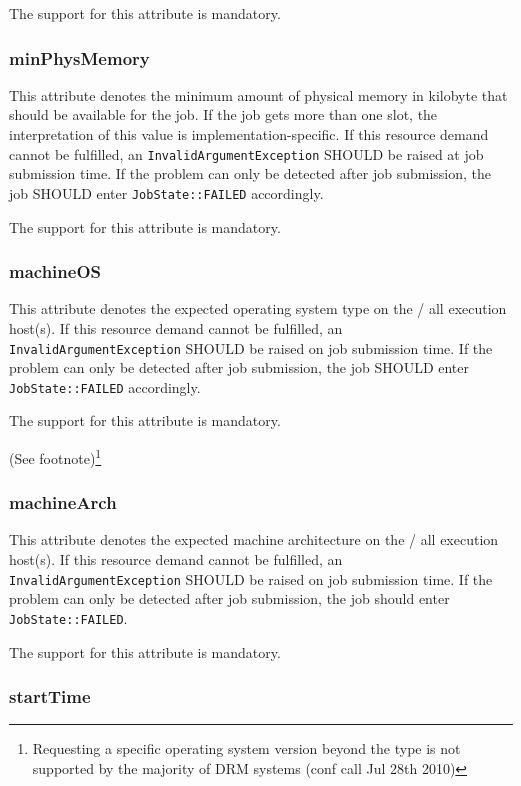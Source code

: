 \documentclass{article}
\newcommand{\h}[1]{\lstinline|#1|}
\newcommand{\rat}[1]{ {\tiny(See footnote)}\footnote{#1} }
\begin{document}
The support for this attribute is mandatory.

\subsubsection{minPhysMemory}

This attribute denotes the minimum amount of physical memory in kilobyte that should be available for the job. If the job gets more than one slot, the interpretation of this value is implementation-specific. If this resource demand cannot be fulfilled, an \h{InvalidArgumentException} SHOULD be raised at job submission time. If the problem can only be detected after job submission, the job SHOULD enter \h{JobState::FAILED} accordingly.

The support for this attribute is mandatory.

\subsubsection{machineOS}

This attribute denotes the expected operating system type on the / all execution host(s). If this resource demand cannot be fulfilled, an \h{InvalidArgumentException} SHOULD be raised on job submission time. If the problem can only be detected after job submission, the job SHOULD enter \h{JobState::FAILED} accordingly.

The support for this attribute is mandatory.

\rat{
Requesting a specific operating system version beyond the type is not supported by the majority of DRM systems (conf call Jul 28th 2010)
}

\subsubsection{machineArch}

This attribute denotes the expected machine architecture on the / all execution host(s). If this resource demand cannot be fulfilled, an \h{InvalidArgumentException} SHOULD be raised on job submission time. If the problem can only be detected after job submission, the job should enter \h{JobState::FAILED}. 

The support for this attribute is mandatory.

\subsubsection{startTime}
\end{document}
